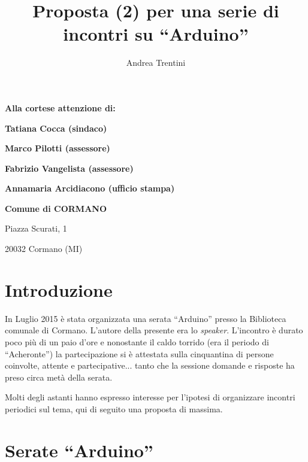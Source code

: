 \documentclass[a4paper,12pt]{article}
\title{\textbf{Proposta (2) per una serie di incontri su ``Arduino''}}
\author{Andrea Trentini}
\begin{document}
\maketitle
\thispagestyle{fancy}

\hspace{.30\textwidth}\textbf{Alla cortese attenzione di:}

\hspace{.40\textwidth}\textbf{Tatiana Cocca (sindaco)}

\hspace{.40\textwidth}\textbf{Marco Pilotti (assessore)}

\hspace{.40\textwidth}\textbf{Fabrizio Vangelista (assessore)}

\hspace{.40\textwidth}\textbf{Annamaria Arcidiacono (ufficio stampa)}

\medskip

\hspace{.30\textwidth}\textbf{Comune di CORMANO}

\hspace{.30\textwidth}Piazza Scurati, 1

\hspace{.30\textwidth}20032 Cormano (MI)





\section*{Introduzione}

In Luglio 2015 è stata organizzata una serata ``Arduino'' presso la Biblioteca 
comunale di Cormano. L'autore della presente era lo \textit{speaker}.
L'incontro è durato poco più di un paio d'ore e nonostante il caldo torrido 
(era il periodo di ``Acheronte'') la partecipazione si è attestata sulla 
cinquantina di persone coinvolte, attente e partecipative... tanto che la 
sessione domande e risposte ha preso circa metà della serata.

Molti degli astanti hanno espresso interesse per l'ipotesi di organizzare 
incontri periodici sul tema, qui di seguito una proposta di massima.

\section*{Serate ``Arduino''}
\end{document}
